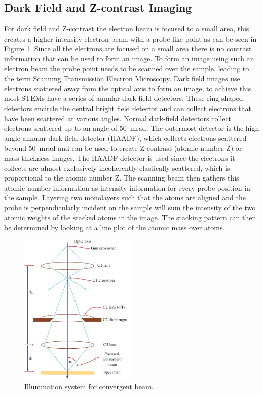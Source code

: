 \subsection{Dark Field and Z-contrast Imaging}
For dark field and Z-contrast the electron beam is focused to a small area, this creates a higher intensity electron beam with a probe-like point as can be seen in Figure \ref{fig:stem_operating}. Since all the electrons are focused on a small area there is no contrast information that can be used to form an image. To form an image using such an electron beam the probe point needs to be scanned over the sample, leading to the term Scanning Transmission Electron Microscopy.
Dark field images use electrons scattered away from the optical axis to form an image, to achieve this most STEMs have a series of annular dark field detectors.
These ring-shaped detectors encircle the central bright field detector and can collect electrons that have been scattered at various angles. Normal dark-field detectors collect electrons scattered up to an angle of \SI{50}{\milli \radian}. The outermost detector is the high angle annular dark-field detector (HAADF), which collects electrons scattered beyond \SI{50}{\milli \radian} and can be used to create Z-contrast (atomic number Z) or mass-thickness images.
The HAADF detector is used since the electrons it collects are almost exclusively incoherently elastically scattered, which is proportional to the atomic number Z.
The scanning beam then gathers this atomic number information as intensity information for every probe position in the sample.
Layering two monolayers such that the atoms are aligned and the probe is perpendicularly incident on the sample will sum the intensity of the two atomic weights of the stacked atoms in the image. The stacking pattern can then be determined by looking at a line plot of the atomic mass over atoms.  
\begin{figure}[h]
    \centering
    \includegraphics[width=0.5\textwidth, keepaspectratio]{resources/Figures/stem_operating.png}
    \caption{Illumination system for convergent beam.}
    \label{fig:stem_operating}
\end{figure}

